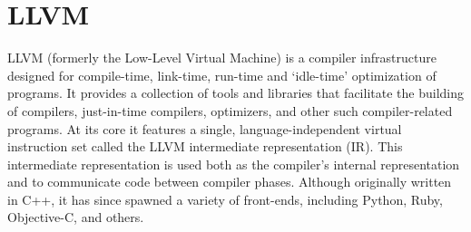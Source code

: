 \section{LLVM}
\label{sec:llvm}

LLVM (formerly the Low-Level Virtual Machine\cite{llvm_name}) is a compiler infrastructure designed for compile-time, link-time, run-time and `idle-time' optimization of programs. It provides a collection of tools and libraries that facilitate the building of compilers, just-in-time compilers, optimizers, and other such compiler-related programs. At its core it features a single, language-independent virtual instruction set called the LLVM intermediate representation (IR). This intermediate representation is used both as the compiler's internal representation and to communicate code between compiler phases.
 Although originally written in C++, it has since spawned a variety of front-ends, including Python, Ruby, Objective-C, and others.
